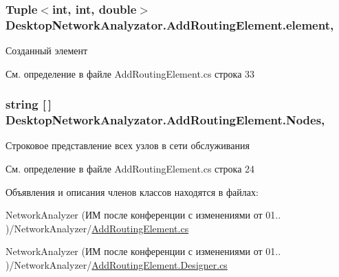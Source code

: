 \subsubsection[{\texorpdfstring{element}{element}}]{\setlength{\rightskip}{0pt plus 5cm}Tuple$<$int, int, double$>$ Desktop\+Network\+Analyzator.\+Add\+Routing\+Element.\+element\hspace{0.3cm}{\ttfamily [get]}, {\ttfamily [set]}}\hypertarget{class_desktop_network_analyzator_1_1_add_routing_element_ae93eacfe6cd3845360542b1e6b727a04}{}\label{class_desktop_network_analyzator_1_1_add_routing_element_ae93eacfe6cd3845360542b1e6b727a04}


Созданный элемент 



См. определение в файле Add\+Routing\+Element.\+cs строка 33

\subsubsection[{\texorpdfstring{Nodes}{Nodes}}]{\setlength{\rightskip}{0pt plus 5cm}string \mbox{[}$\,$\mbox{]} Desktop\+Network\+Analyzator.\+Add\+Routing\+Element.\+Nodes\hspace{0.3cm}{\ttfamily [get]}, {\ttfamily [set]}}\hypertarget{class_desktop_network_analyzator_1_1_add_routing_element_a51fe780180cfe2071a33bd0e1c3db398}{}\label{class_desktop_network_analyzator_1_1_add_routing_element_a51fe780180cfe2071a33bd0e1c3db398}


Строковое представление всех узлов в сети обслуживания 



См. определение в файле Add\+Routing\+Element.\+cs строка 24



Объявления и описания членов классов находятся в файлах\+:\begin{DoxyCompactItemize}
\item 
Network\+Analyzer (ИМ после конференции  с изменениями от 01.. )/\+Network\+Analyzer/\hyperlink{_add_routing_element_8cs}{Add\+Routing\+Element.\+cs}\item 
Network\+Analyzer (ИМ после конференции  с изменениями от 01.. )/\+Network\+Analyzer/\hyperlink{_add_routing_element_8_designer_8cs}{Add\+Routing\+Element.\+Designer.\+cs}\end{DoxyCompactItemize}
